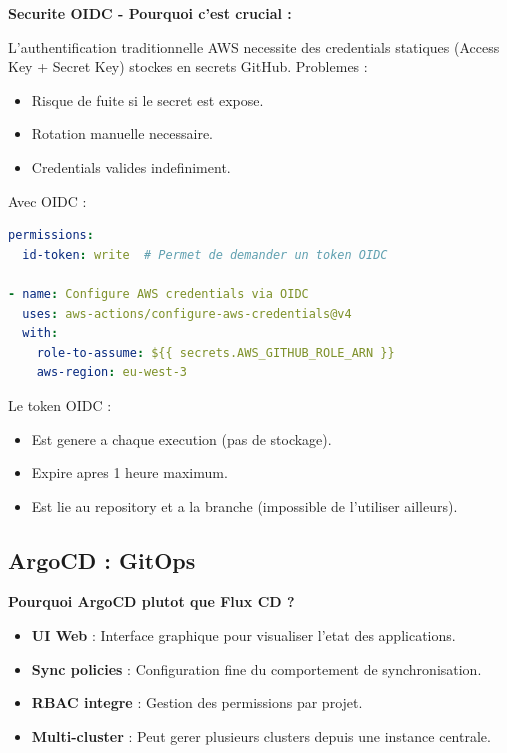 \documentclass[12pt,a4paper,french]{report}
\begin{document}
\textbf{Securite OIDC - Pourquoi c'est crucial :}

L'authentification traditionnelle AWS necessite des credentials statiques (Access Key + Secret Key) stockes en secrets GitHub. Problemes :
\begin{itemize}
    \item Risque de fuite si le secret est expose.
    \item Rotation manuelle necessaire.
    \item Credentials valides indefiniment.
\end{itemize}

Avec OIDC :
\begin{lstlisting}[language=yaml, caption=Authentification OIDC (extrait de ci.yml)]
permissions:
  id-token: write  # Permet de demander un token OIDC

- name: Configure AWS credentials via OIDC
  uses: aws-actions/configure-aws-credentials@v4
  with:
    role-to-assume: ${{ secrets.AWS_GITHUB_ROLE_ARN }}
    aws-region: eu-west-3
\end{lstlisting}

Le token OIDC :
\begin{itemize}
    \item Est genere a chaque execution (pas de stockage).
    \item Expire apres 1 heure maximum.
    \item Est lie au repository et a la branche (impossible de l'utiliser ailleurs).
\end{itemize}

\subsection{ArgoCD : GitOps}

\textbf{Pourquoi ArgoCD plutot que Flux CD ?}

\begin{itemize}
    \item \textbf{UI Web} : Interface graphique pour visualiser l'etat des applications.
    \item \textbf{Sync policies} : Configuration fine du comportement de synchronisation.
    \item \textbf{RBAC integre} : Gestion des permissions par projet.
    \item \textbf{Multi-cluster} : Peut gerer plusieurs clusters depuis une instance centrale.
\end{itemize}
\end{document}
